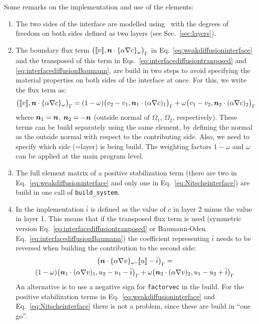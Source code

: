 Some remarks on the implementation and use of the elements:
\begin{enumerate}
   \item The two sides of the interface are modelled using \xfem\ with the
     degrees of freedom on both sides defined as two layers (see
     Sec.~\ref{sec:layers}).
   \item The boundary flux term $\big(\text{[\![} v\text{]\!]},\boldsymbol{n}\cdot\{\alpha\nabla
c\}_\omega\big)_{\Gamma}$ in Eq.~\eqref{eq:weakdiffusioninterface} and
   the transposed of this term in Eqs.~\eqref{eq:interfacediffusiontranposed}
and \eqref{eq:interfacediffusionBaumann}, are build in two steps to avoid
specifying the material properties on both sides of the interface at once.
For this, we write the flux term as:
\begin{equation}
   \big(\text{[\![} v\text{]\!]},\boldsymbol{n}\cdot\{\alpha\nabla c\}_\omega\big)_{\Gamma}=
   (1-\omega)\big(v_2-v_1,\boldsymbol{n}_1\cdot(\alpha\nabla c)_1\big)_{\Gamma}
   +\omega\big(v_1-v_2,\boldsymbol{n}_2\cdot(\alpha\nabla c)_2\big)_{\Gamma}
\end{equation}
where $\boldsymbol{n}_1=\boldsymbol{n}$, $\boldsymbol{n}_2=-\boldsymbol{n}$ (outside normal of $\Omega_1$,
$\Omega_2$, respectively). These terms can be build separately using the same
element, by defining the normal as the outside normal with respect to the
contributing side. Also, we need to specify which side (=layer) is being build.
The weighting factors $1-\omega$ and $\omega$ can be applied at the main
program level.
   \item The full element matrix of a positive stabilization term 
         (there are two in
         Eq.~\eqref{eq:weakdiffusioninterface} and only one in
          Eq.~\eqref{eq:Nitscheinterface}) are build in one call of
         \texttt{build\_system}.
  \item In the implementation $\bar i$ is defined as the value of $c$ in
        layer 2 minus the value in layer 1. This means that if the transposed
flux term is used (symmetric version 
Eq.~\eqref{eq:interfacediffusiontranposed}
or Baumann-Oden Eq.~\eqref{eq:interfacediffusionBaumann}) the coefficient
representing $\bar i$ needs to be reversed when building the contribution to
the second side:
\begin{multline}
   \big(\boldsymbol{n}\cdot\{\alpha\nabla v\}_\omega,\text{[\![} u\text{]\!]}-\bar i\big)_{\Gamma}=\\
  (1-\omega)\big(\boldsymbol{n}_1\cdot(\alpha\nabla v)_1, u_2-u_1-\bar i\big)_{\Gamma}
  +\omega\big(\boldsymbol{n}_2\cdot(\alpha\nabla v)_2,u_1-u_2+\bar i\big)_{\Gamma}
\end{multline}
An alternative is to use a negative sign for \texttt{factorvec} in the build.
For the positive stabilization terms in Eq.~\eqref{eq:weakdiffusioninterface}
and Eq.~\eqref{eq:Nitscheinterface} there is not a problem, since these are
build in ``one go''.
\end{enumerate}


